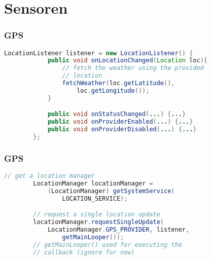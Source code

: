 \section{Sensoren}

\begin{frame}[fragile]
	\frametitle{GPS}
	\vspace{-3mm}
	\begin{lstlisting}[language=Java]
		LocationListener listener = new LocationListener() {
		    public void onLocationChanged(Location loc){
		    	// fetch the weather using the provided
		    	// location
		        fetchWeather(loc.getLatitude(),
		            loc.getLongitude()); 
		    }

		    public void onStatusChanged(...) {...}
		    public void onProviderEnabled(...) {...}
		    public void onProviderDisabled(...) {...}
		};
    \end{lstlisting}	
	
\end{frame}

\begin{frame}[fragile]
	\frametitle{GPS}
	\begin{lstlisting}[language=Java]
		// get a location manager
		LocationManager locationManager =
		    (LocationManager) getSystemService(
		        LOCATION_SERVICE);

		// request a single location update
		locationManager.requestSingleUpdate(
		    LocationManager.GPS_PROVIDER, listener,
		        getMainLooper());
		// getMainLooper() used for executing the
		// callback (ignore for now)
    \end{lstlisting}
\end{frame}

